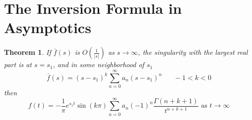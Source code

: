 \documentclass{report}
\newtheorem{theorem}{Theorem}[chapter]
\theoremstyle{definition}
\theoremstyle{remark}
\newcommand{\twen}{\hspace{20pt}}
\begin{document}
\section{The Inversion Formula in Asymptotics}
\begin{theorem}
    If $\bar f (s)$ is $O\left( \frac{1}{|s|} \right)$ as $s\rightarrow \infty$, the singularity with the largest real part is at $s=s_1$, and in some neighborhood of $s_1$
    \begin{equation*}
        \bar f(s) = (s-s_1)^k \sum^\infty_{n=0} a_n(s-s_1)^n \twen -1<k<0
    \end{equation*}
    then 
    \begin{equation*}
        f(t) = -\frac{1}{\pi}e^{s_1 t}\sin(k\pi) \sum^\infty_{n=0}a_n(-1)^n \frac{\Gamma(n+k+1)}{t^{n+k+1}} \text{ as }t\rightarrow \infty
    \end{equation*}
\end{theorem}
\end{document}
